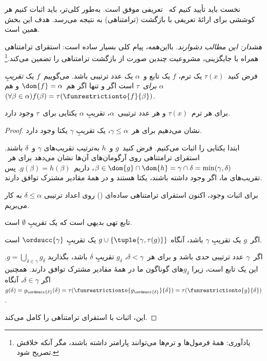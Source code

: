\documentclass[../../../include/open-logic-section]{subfiles}
\begin{document}

نخست باید تأیید کنیم که~ تعریفی موفق است.
به‌طور کلی‌تر، باید اثبات کنیم هر کوششی برای ارائهٔ تعریفی با بازگشت
(ترامتناهی) به نتیجه می‌رسد. هدف این بخش همین است.

\emph{هشدار: این مطالب دشوارند}. بااین‌همه، پیام کلی بسیار ساده است:
استقرای ترامتناهی همراه با جایگزینی، مشروعیت چندین صورت از بازگشت
ترامتناهی را تضمین می‌کند.\footnote{یادآوری: همهٔ فرمول‌ها و ترم‌ها
می‌توانند پارامتر داشته باشند، مگر آنکه خلافش تصریح شود.}

\begin{defn}
	فرض کنید~$\tau(x)$ یک ترم، $f$ یک تابع و~$\alpha$ یک عدد ترتیبی باشد.
	می‌گوییم~$f$ یک \emph{تقریبِ $\alpha$ برای~$\tau$} است اگر و تنها اگر
	هم~$\dom{f}=\alpha$ و هم
	$(\forall \beta \in \alpha)f(\beta)=\tau(\funrestrictionto{f}{\beta})$.
\end{defn}

\begin{lem}
برای هر ترم~$\tau(x)$ و هر عدد ترتیبی~$\alpha$، تقریبِ $\alpha$ یکتایی
برای~$\tau$ وجود دارد.
\end{lem}
\begin{proof}
نشان می‌دهیم برای هر~$\gamma\leq\alpha$، یک تقریبِ $\gamma$ یکتا وجود
دارد.

ابتدا یکتایی را اثبات می‌کنیم. فرض کنید~$g$ و~$h$ به‌ترتیب تقریب‌های
$\gamma$ و~$\delta$ باشند. استقرای ترامتناهی روی آرگومان‌های آن‌ها نشان
می‌دهد برای هر~$\beta\in\dom{g}\cap\dom{h}=\gamma\cap\delta=
\min(\gamma,\delta)$، داریم~$g(\beta)=h(\beta)$. پس تقریب‌های ما، اگر
وجود داشته باشند، یکتا هستند و در همهٔ مقادیر مشترک توافق دارند.

برای اثبات وجود، اکنون استقرای ترامتناهی ساده‌ای
() روی اعداد ترتیبی
$\delta\leq\alpha$ به کار می‌بریم.

تابع تهی بدیهی است که یک تقریبِ $\emptyset$ است.

اگر~$g$ یک تقریبِ $\gamma$ باشد، آنگاه
$g\cup\{\tuple{\gamma,\tau(g)}\}$ یک تقریبِ
$\ordsucc{\gamma}$ است.

اگر~$\gamma$ عدد ترتیبی حدی باشد و برای هر~$\delta<\gamma$،
$g_\delta$ تقریبِ $\delta$ باشد، بگذارید
$g=\bigcup_{\delta\in\gamma}g_\delta$. این یک تابع است، زیرا
$g_\delta$های گوناگون ما در همهٔ مقادیر مشترک توافق دارند. همچنین اگر
$\delta\in\gamma$، آنگاه
$g(\delta)=g_{\ordsucc{\delta}}(\delta)=
\tau(\funrestrictionto{g_{\ordsucc{\delta}}}{\delta})=
\tau(\funrestrictionto{g}{\delta})$.

این، اثبات با استقرای ترامتناهی را کامل می‌کند.
\end{proof}
\end{document}
